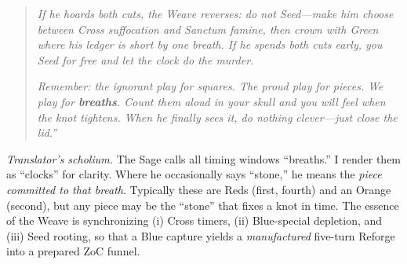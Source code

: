 \documentclass[11pt]{article}
\begin{document}
\begin{quote}
\emph{If he hoards both cuts, the Weave reverses: do not Seed—make him choose between Cross suffocation and Sanctum famine, then crown with Green where his ledger is short by one breath. If he spends both cuts early, you Seed for free and let the clock do the murder.}

\emph{Remember: the ignorant play for squares. The proud play for pieces. We play for \textbf{breaths}. Count them aloud in your skull and you will feel when the knot tightens. When he finally sees it, do nothing clever—just close the lid.”}
\end{quote}

\noindent\textit{Translator’s scholium.} The Sage calls all timing windows “breaths.” I render them as “clocks” for clarity. Where he occasionally says “stone,” he means the \emph{piece committed to that breath}. Typically these are Reds (first, fourth) and an Orange (second), but any piece may be the “stone” that fixes a knot in time. The essence of the Weave is synchronizing (i) Cross timers, (ii) Blue-special depletion, and (iii) Seed rooting, so that a Blue capture yields a \emph{manufactured} five-turn Reforge into a prepared ZoC funnel.
\end{document}
